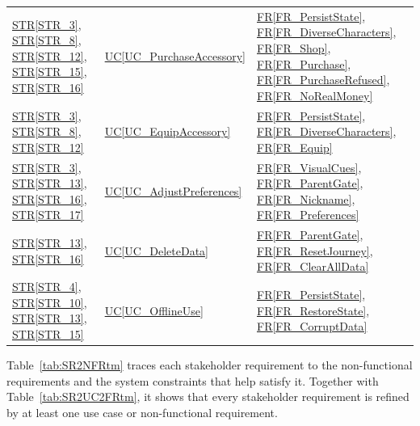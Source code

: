 \documentclass[10pt]{article}
\newcommand{\strref}[1]{\hyperref[#1]{STR\ref*{#1}}}
\newcommand{\ucref}[1]{\hyperref[#1]{UC\ref*{#1}}}
\newcommand{\rref}[1]{\hyperref[#1]{FR\ref*{#1}}}
\begin{document}
\begin{longtable}{@{}p{} p{} p{}@{}}
\strref{STR_3}, \strref{STR_8}, \strref{STR_12}, \strref{STR_15}, \strref{STR_16} 
& \ucref{UC_PurchaseAccessory} & \rref{FR_PersistState}, \rref{FR_DiverseCharacters}, \rref{FR_Shop}, \rref{FR_Purchase}, \rref{FR_PurchaseRefused}, \rref{FR_NoRealMoney} \\

\strref{STR_3}, \strref{STR_8}, \strref{STR_12} 
& \ucref{UC_EquipAccessory} & \rref{FR_PersistState}, \rref{FR_DiverseCharacters}, \rref{FR_Equip} \\

\strref{STR_3}, \strref{STR_13}, \strref{STR_16}, \strref{STR_17} 
& \ucref{UC_AdjustPreferences} & \rref{FR_VisualCues}, \rref{FR_ParentGate}, \rref{FR_Nickname}, \rref{FR_Preferences} \\

\strref{STR_13}, \strref{STR_16} & \ucref{UC_DeleteData} & \rref{FR_ParentGate}, \rref{FR_ResetJourney}, \rref{FR_ClearAllData} \\

\strref{STR_4}, \strref{STR_10}, \strref{STR_13}, \strref{STR_15} & \ucref{UC_OfflineUse} 
& \rref{FR_PersistState}, \rref{FR_RestoreState}, \rref{FR_CorruptData} \\
\end{longtable}

Table~\ref{tab:SR2NFRtm} traces each stakeholder requirement to the
non-functional requirements and the system constraints that help satisfy it.
Together with Table~\ref{tab:SR2UC2FRtm}, it shows that every stakeholder
requirement is refined by at least one use case or non-functional requirement.
\end{document}
